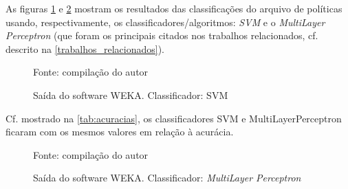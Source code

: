 As figuras \ref{fig:saida_svm} e \ref{fig:saida_multilayerperceptron} mostram os resultados das classificações do arquivo de políticas usando, respectivamente, os classificadores/algoritmos: \textit{SVM} e o \textit{MultiLayer Perceptron} (que foram os principais citados nos trabalhos relacionados, cf. descrito na \autoref{trabalhos_relacionados}).  %
\begin{figure}[H]
	\centering
	\caption{Saída do software WEKA. Classificador: SVM}

	\label{fig:saida_svm}
	{\scriptsize Fonte: compilação do autor}
\end{figure}

Cf. mostrado na \autoref{tab:acuracias}, os classificadores SVM e MultiLayerPerceptron ficaram com os mesmos valores em relação à acurácia.

\begin{figure}[H]
	\centering
	\caption{Saída do software WEKA. Classificador: \textit{MultiLayer Perceptron}}
 
	\label{fig:saida_multilayerperceptron}
	{\scriptsize Fonte: compilação do autor}
\end{figure}

